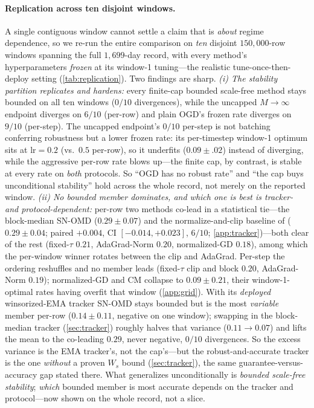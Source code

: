\documentclass{article}
\begin{document}
\paragraph{Replication across ten disjoint windows.} A single contiguous window cannot
settle a claim that is \emph{about} regime dependence, so we re-run the entire comparison on
\emph{ten} disjoint $150{,}000$-row windows spanning the full $1{,}699$-day record, with every
method's hyperparameters \emph{frozen} at its window-1 tuning---the realistic
tune-once-then-deploy setting (\cref{tab:replication}). Two findings are sharp. \emph{(i) The
stability partition replicates and hardens:} every finite-cap bounded scale-free method stays
bounded on all ten windows ($0/10$ divergences), while the uncapped $M\!\to\!\infty$ endpoint
diverges on $6/10$ (per-row) and plain OGD's frozen rate diverges on $9/10$ (per-step). The
uncapped endpoint's $0/10$ per-step is not batching conferring robustness but a lower frozen
rate: its per-timestep window-1 optimum sits at $\mathrm{lr}{=}0.2$ (vs.\ $0.5$ per-row), so it
underfits ($0.09\!\pm\!.02$) instead of diverging, while the aggressive per-row rate blows
up---the finite cap, by contrast, is stable at every rate on \emph{both} protocols. So ``OGD
has no robust rate'' and ``the cap buys unconditional stability'' hold
across the whole record, not merely on the reported window. \emph{(ii) No bounded member dominates, and which
one is best is tracker- and protocol-dependent:} per-row two methods co-lead in a statistical
tie---the block-median SN-OMD ($0.29\!\pm\!0.07$) and the normalize-and-clip baseline of
\citet{cutkoskymehta2021} ($0.29\!\pm\!0.04$; paired $+0.004$, CI $[-0.014,+0.023]$, $6/10$;
\cref{app:tracker})---both clear of the rest (fixed-$\tau$ $0.21$,
AdaGrad-Norm $0.20$, normalized-GD $0.18$), among which the per-window winner rotates between the
clip and AdaGrad. Per-step the ordering reshuffles and no member leads (fixed-$\tau$
clip and block $0.20$, AdaGrad-Norm $0.19$); normalized-GD and CM collapse to $0.09\!\pm\!0.21$,
their window-1-optimal rates having overfit that window (\cref{app:grid}). With its \emph{deployed} winsorized-EMA tracker SN-OMD
stays bounded but is the most \emph{variable} member per-row ($0.14\!\pm\!0.11$, negative on one
window); swapping in the block-median tracker (\cref{sec:tracker}) roughly halves that variance
($0.11\!\to\!0.07$) and lifts the mean to the co-leading $0.29$, never negative, $0/10$
divergences. So the excess variance is the EMA tracker's, not the cap's---but the
robust-and-accurate tracker is the one \emph{without} a proven $W_s$ bound (\cref{sec:tracker}),
the same guarantee-versus-accuracy gap stated there. What generalizes unconditionally is
\emph{bounded scale-free stability}; \emph{which} bounded member is most accurate depends on
the tracker and protocol---now shown on the whole record, not a slice.
\end{document}
